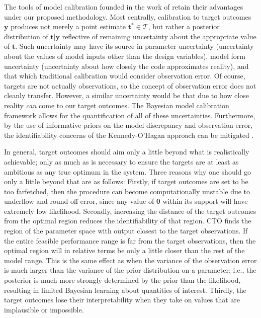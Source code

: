\documentclass[12pt]{article}
\begin{document}
The tools of model calibration founded in the work of \cite{Kennedy2001} retain their advantages under our proposed methodology.
%
Most centrally, calibration to target outcomes $\mathbf y$ produces not merely a point estimate $\mathbf t^*\in\mathcal T$, but rather a posterior distribution of $\mathbf t|\mathbf y$ reflective of remaining uncertainty about the appropriate value of $\mathbf t$. 
%
Such uncertainty may have its source in parameter uncertainty (uncertainty about the values of model inputs other than the design variables), model form uncertainty (uncertainty about how closely the code approximates reality), and that which traditional calibration would consider observation error. 
%
Of course,  targets are not actually observations, so the concept of observation error does not cleanly transfer. 
%
However, a similar uncertainty would be that due to how close reality \emph{can} come to our target outcomes. 
%
The Bayesian model calibration framework allows for the quantification of all of these uncertainties. 
%
Furthermore, by the use of informative priors on the model discrepancy and observation error, the identifiability concerns of the Kennedy-O'Hagan approach can be mitigated \citep{Bayarri2007,Tuo2016}.

In general, target outcomes should aim only a little beyond what is realistically achievable; only as much as is necessary to ensure the targets are at least as ambitious as any true optimum in the system.
%
Three reasons why one should go only a little beyond that are as follows: 
%
Firstly, if target outcomes are set to be too farfetched, then the procedure can become computationally unstable due  to underflow and round-off error, since any value of $\boldsymbol \theta$ within its support will have extremely low likelihood.
%
Secondly, increasing the distance of the target outcomes from the optimal region reduces the identifiability of that region.
%
CTO finds the region of the parameter space with output closest to the target observations.
%
If the entire feasible performance range is far from the target observations, then the optimal region will in relative terms be only a little closer than the rest of the model range. 
% 
This is the same effect as when the variance of the observation error is much larger than the variance of the prior distribution on a parameter; i.e., the posterior is much more strongly determined by the prior than the likelihood, resulting in limited Bayesian learning about quantities of interest.
%
%
Thirdly, the target outcomes lose their interpretability when they take on values that are implausible or impossible. 
%
\end{document}
